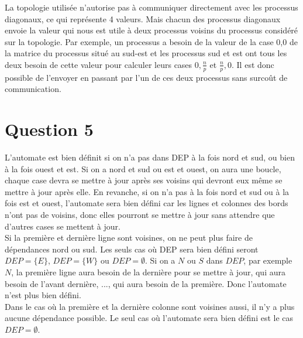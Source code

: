 \documentclass[a4paper,11pt]{article}
\begin{document}
La topologie utilisée n'autorise pas à communiquer directement avec les processus diagonaux, ce qui représente 4 valeurs. Mais chacun des processus diagonaux envoie la valeur qui nous est utile à deux processus voisins du processus considéré sur la topologie. Par exemple, un processus a besoin de la valeur de la case 0,0 de la matrice du processus situé au sud-est et les processus sud et est ont tous les deux besoin de cette valeur pour calculer leurs cases $0,\frac n p$ et $\frac n p,0$. Il est donc possible de l'envoyer en passant par l'un de ces deux processus sans surcoût de communication.




\section*{Question 5}
L'automate est bien définit si on n'a pas dans DEP à la fois nord et sud, ou bien à la fois ouest et est. Si on a nord et sud ou est et ouest, on aura une boucle, chaque case devra se mettre à jour après ses voisins qui devront eux même se mettre à jour après elle.
En revanche, si on n'a pas à la fois nord et sud ou à la fois est et ouest, l'automate sera bien défini car les lignes et colonnes des bords n'ont pas de voisins, donc elles pourront se mettre à jour sans attendre que d'autres cases se mettent à jour.\\
Si la première et dernière ligne sont voisines, on ne peut plus faire de dépendances nord ou sud. Les seuls cas où DEP sera bien défini seront $DEP = \{E\}$, $DEP = \{W\}$ ou $DEP = \emptyset$. Si on a $N$ ou $S$ dans $DEP$, par exemple $N$, la première ligne aura besoin de la dernière pour se mettre à jour, qui aura besoin de l'avant dernière, ..., qui aura besoin de la première. Donc l'automate n'est plus bien défini.\\
Dans le cas où la première et la dernière colonne sont voisines aussi, il n'y a plus aucune dépendance possible. Le seul cas où l'automate sera bien défini est le cas $DEP = \emptyset$.
\end{document}
